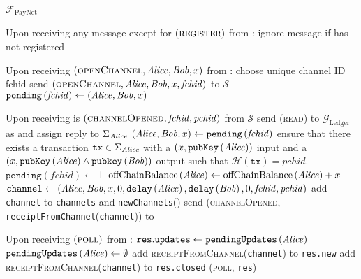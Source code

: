 \begin{functionality}{$\mathcal{F}_{\mathrm{PayNet}}$}
\begin{algorithmic}[1]
    \State Upon receiving any message except for
    $\left(\textsc{register}\right)$ from \alice:
    \Indent
      \State ignore message if \alice has not registered
    \EndIndent
    \State

    \State Upon receiving $\left(\textsc{openChannel}, \mathit{Alice}, \mathit{Bob}, x\right)$
    from \alice:
    \Indent
      \State choose unique channel ID fchid
      \State send $\left(\textsc{openChannel}, \mathit{Alice}, \mathit{Bob}, x,
      \mathit{fchid}\right)$ to $\mathcal{S}$
      \State $\mathtt{pending}\left(\mathit{fchid}\right) \gets \left(\mathit{Alice},
      \mathit{Bob}, x\right)$
    \EndIndent
    \State

    \State Upon receiving is $\left(\textsc{channelOpened}, \mathit{fchid},
    \mathit{pchid}\right)$ from $\mathcal{S}$
    \Indent
      \State send (\textsc{read}) to $\mathcal{G}_{\mathrm{Ledger}}$ as
      \alice and assign reply to $\Sigma_{\mathit{Alice}}$
      \State $\left(\mathit{Alice}, \mathit{Bob}, x\right) \gets
      \mathtt{pending}\left(\mathit{fchid}\right)$
      \State ensure that there exists a transaction $\mathtt{tx} \in
      \Sigma_{\mathit{Alice}}$ with a $\left(x,
      \mathtt{pubKey}\left(\mathit{Alice}\right)\right)$ input and a $\left(x,
      \mathtt{pubKey}\left(\mathit{Alice}\right) \wedge
      \mathtt{pubkey}\left(\mathit{Bob}\right)\right)$ output such that
      $\mathcal{H}\left(\mathtt{tx}\right) = \mathit{pchid}$. 
      \State $\mathtt{pending}\left(\mathit{fchid}\right) \gets \bot$
      \State $\mathrm{offChainBalance}\left(\mathit{Alice}\right) \gets
      \mathrm{offChainBalance}\left(\mathit{Alice}\right) + x$ 
      \State $\mathtt{channel} \gets \left(\mathit{Alice}, \mathit{Bob}, x, 0,
      \mathtt{delay}\left(\mathit{Alice}\right), \mathtt{delay}\left(\mathit{Bob}\right), 0,
      \mathit{fchid}, \mathit{pchid}\right)$
      \State add \texttt{channel} to \texttt{channels} and
      \texttt{newChannels}(\bob)
      \State send (\textsc{channelOpened},
      \texttt{receiptFromChannel}(\texttt{channel})) to \alice
    \EndIndent
    \State

    \State Upon receiving $\left(\textsc{poll}\right)$ from \alice:
    \Indent
      \State {}
      \State {} 
      \State $\mathtt{res.updates} \gets
      \mathtt{pendingUpdates}\left(\mathit{Alice}\right)$
      \State $\mathtt{pendingUpdates}\left(\mathit{Alice}\right) \gets \emptyset$
        \State add \textsc{receiptFromChannel}(\texttt{channel}) to
        \texttt{res.new}
      \EndFor
        \State add \textsc{receiptFromChannel}(\texttt{channel}) to
        \texttt{res.closed}
      \EndFor
      \State \Return (\textsc{poll}, \texttt{res}) \alice
    \EndIndent
    \State


\end{algorithmic}
\end{functionality}
